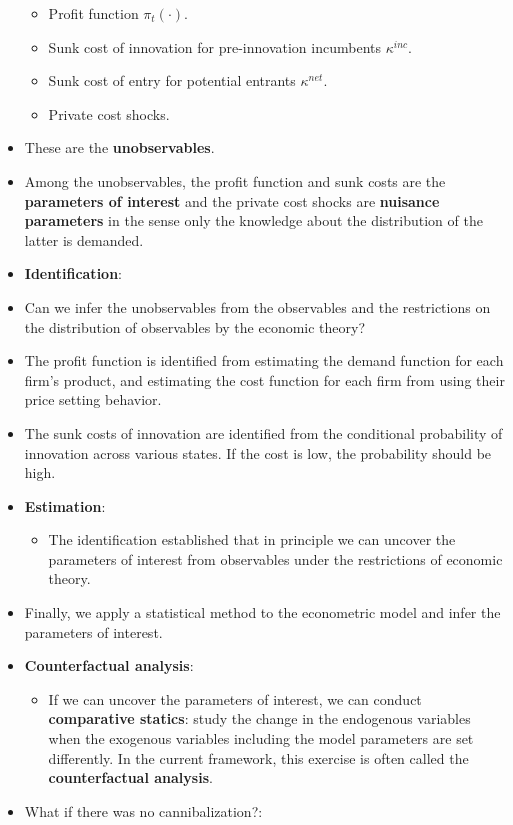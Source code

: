 \documentclass[
]{book}
\providecommand{\tightlist}{%
  \setlength{\itemsep}{0pt}\setlength{\parskip}{0pt}}
\begin{document}
\begin{itemize}
  \begin{itemize}
  \tightlist
  \item
    Profit function \(\pi_t(\cdot)\).
  \item
    Sunk cost of innovation for pre-innovation incumbents \(\kappa^{inc}\).
  \item
    Sunk cost of entry for potential entrants \(\kappa^{net}\).
  \item
    Private cost shocks.
  \end{itemize}
\item
  These are the \textbf{unobservables}.
\item
  Among the unobservables, the profit function and sunk costs are the \textbf{parameters of interest} and the private cost shocks are \textbf{nuisance parameters} in the sense only the knowledge about the distribution of the latter is demanded.
\item
  \textbf{Identification}:
\item
  Can we infer the unobservables from the observables and the restrictions on the distribution of observables by the economic theory?
\item
  The profit function is identified from estimating the demand function for each firm's product, and estimating the cost function for each firm from using their price setting behavior.
\item
  The sunk costs of innovation are identified from the conditional probability of innovation across various states. If the cost is low, the probability should be high.
\item
  \textbf{Estimation}:

  \begin{itemize}
  \tightlist
  \item
    The identification established that in principle we can uncover the parameters of interest from observables under the restrictions of economic theory.
  \end{itemize}
\item
  Finally, we apply a statistical method to the econometric model and infer the parameters of interest.
\item
  \textbf{Counterfactual analysis}:

  \begin{itemize}
  \tightlist
  \item
    If we can uncover the parameters of interest, we can conduct \textbf{comparative statics}: study the change in the endogenous variables when the exogenous variables including the model parameters are set differently. In the current framework, this exercise is often called the \textbf{counterfactual analysis}.
  \end{itemize}
\item
  What if there was no cannibalization?:


\end{itemize}
\end{document}
